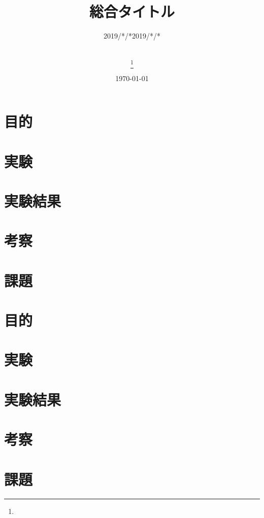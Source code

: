 \documentclass[uplatex, 11pt,a4j, titlepage]{jsarticle}
\title{総合タイトル}
\date{\today}
\author{
    \small{\myid} \\
    \myname\thanks{\mymail}
}
\begin{document}
\maketitle


\subtitle{2019/*/*}

\section{目的}
\section{実験}
\section{実験結果}
\section{考察}
\section{課題}


\newpage
\resetcounters


\subtitle{2019/*/*}

\section{目的}
\section{実験}
\section{実験結果}
\section{考察}
\section{課題}



\newpage
\thispagestyle{empty}
\nocite{Material}


\end{document}
